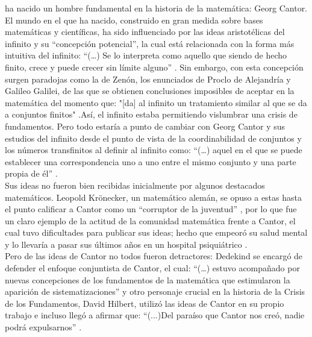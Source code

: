 \documentclass[a4paper,11pt]{article}
\begin{document}
ha nacido un hombre fundamental en la historia de la matemática: Georg Cantor. El mundo en el que ha nacido, construido en gran medida sobre bases matemáticas y científicas, ha sido influenciado por las ideas aristotélicas del infinito y su “concepción potencial”\cite{crespo2006paseo}, la cual está relacionada con la forma más intuitiva del infinito: “(…) Se lo interpreta como aquello que siendo de hecho finito, crece y puede crecer sin límite alguno” \cite[p.2]{crespo2006paseo}. Sin embargo, con esta concepción surgen paradojas como la de Zenón, los enunciados de Proclo de Alejandría y Galileo Galilei, de las que se obtienen conclusiones imposibles de aceptar en la matemática del momento que: "[da] al infinito un tratamiento similar al que se da a conjuntos finitos" \cite[p.2]{crespo2006paseo}.Así, el infinito estaba permitiendo vislumbrar una crisis de fundamentos. Pero todo estaría a punto de cambiar con Georg Cantor y sus estudios del infinito desde el punto de vista de la coordinabilidad de conjuntos y los números transfinitos al definir al infinito como: “(…) aquel en el que se puede establecer una correspondencia uno a uno entre el mismo conjunto y una parte propia de él” \cite[p.5]{crespo2006paseo}. \\
Sus ideas no fueron bien recibidas inicialmente por algunos destacados matemáticos. Leopold Krönecker, un matemático alemán, se opuso a estas hasta el punto calificar a Cantor como un “corruptor de la juventud” \cite{crespo2006paseo}, por lo que fue un claro ejemplo de la actitud de la comunidad matemática frente a Cantor, el cual tuvo dificultades para publicar sus ideas; hecho que empeoró su salud mental y lo llevaría a pasar sus últimos años en un hospital psiquiátrico \cite{dusautoy_2018}. \\
Pero de las ideas de Cantor no todos fueron detractores: Dedekind se encargó de defender el enfoque conjuntista de Cantor, el cual: “(…) estuvo acompañado por nuevas concepciones de los fundamentos de la matemática que estimularon la aparición de sistematizaciones” \cite[p.5]{crespo2006paseo} y otro personaje crucial en la historia de la Crisis de los Fundamentos, David Hilbert, utilizó las ideas de Cantor en su propio trabajo e incluso llegó a afirmar que: “(...)Del paraíso que Cantor nos
creó, nadie podrá expulsarnos” \cite[p.5]{crespo2006paseo}.
\end{document}
